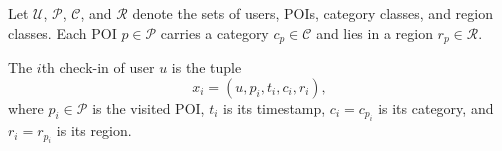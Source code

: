 Let $\mathcal{U}$, $\mathcal{P}$, $\mathcal{C}$, and $\mathcal{R}$ denote the sets of
users, POIs, category classes, and region classes. Each POI $p\in\mathcal{P}$ carries a
category $c_p\in\mathcal{C}$ and lies in a region $r_p\in\mathcal{R}$.

\begin{definition}[Check-in]\label{def:fund:checkin}
    The $i$th check-in of user $u$ is the tuple
    \begin{equation}
        x_i=(u,p_i,t_i,c_i,r_i),
    \end{equation}
    where $p_i\in\mathcal{P}$ is the visited POI, $t_i$ is its timestamp,
    $c_i=c_{p_i}$ is its category, and $r_i=r_{p_i}$ is its region.
\end{definition}

